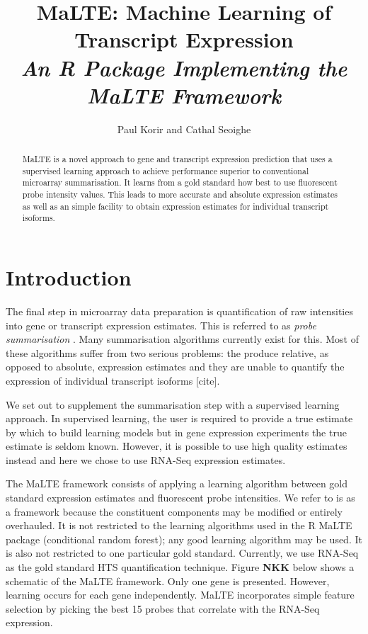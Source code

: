 \documentclass[a4paper,12pt]{article}
\author{Paul Korir and Cathal Seoighe}
\title{\textbf{MaLTE: Machine Learning of Transcript Expression}\\\textit{An \textsf{R} Package Implementing the MaLTE Framework}}
\date{}
\begin{document}
\maketitle

\tableofcontents

\newpage

\begin{abstract}
MaLTE is a novel approach to gene and transcript expression prediction that uses a supervised learning approach to achieve performance superior to conventional microarray summarisation. It learns from a gold standard how best to use fluorescent probe intensity values. This leads to more accurate and absolute expression estimates as well as an simple facility to obtain expression estimates for individual transcript isoforms.
\end{abstract}

\section{Introduction}
\label{introduction}
The final step in microarray data preparation is quantification of raw intensities into gene or transcript expression estimates. This is referred to as \textit{probe summarisation} \cite{irizarry2003summaries}. Many summarisation algorithms currently exist for this. Most of these algorithms suffer from two serious problems: the produce relative, as opposed to absolute, expression estimates \cite{irizarry2005multiple, fu2009estimating} and they are unable to quantify the expression of individual transcript isoforms [cite].

We set out to supplement the summarisation step with a supervised learning approach. In supervised learning, the user is required to provide a true estimate by which to build learning models but in gene expression experiments the true estimate is seldom known. However, it is possible to use high quality estimates instead and here we chose to use RNA-Seq expression estimates.

The MaLTE framework consists of applying a learning algorithm between gold standard expression estimates and fluorescent probe intensities. We refer to is as a framework because the constituent components may be modified or entirely overhauled. It is not restricted to the learning algorithms used in the \textsf{R} MaLTE package (conditional random forest); any good learning algorithm may be used. It is also not restricted to one particular gold standard. Currently, we use RNA-Seq as the gold standard HTS quantification technique. Figure \textbf{NKK} below shows a schematic of the MaLTE framework. Only one gene is presented. However, learning occurs for each gene independently. MaLTE incorporates simple feature selection by picking the best 15 probes that correlate with the RNA-Seq expression.
\end{document}
